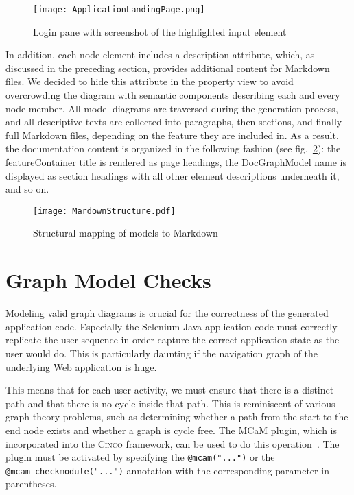 \begin{figure}[h]
    \centering
    \texttt{[image: ApplicationLandingPage.png]}
    \caption{Login pane with screenshot of the highlighted input element}
    \label{fig:screenshot}
\end{figure}

In addition, each node element includes a description attribute, which, as discussed in the preceding section, provides additional content for Markdown files. We decided to hide this attribute in the property view to avoid overcrowding the diagram with semantic components describing each and every node member. All model diagrams are traversed during the generation process, and all descriptive texts are collected into paragraphs, then sections, and finally full Markdown files, depending on the feature they are included in. As a result, the documentation content is organized in the following fashion (see fig.~\ref{fig:markdown}): the featureContainer title is rendered as page headings, the DocGraphModel name is displayed as section headings with all other element descriptions underneath it, and so on.

\begin{figure}[h]
    \centering
    \texttt{[image: MardownStructure.pdf]}
    \caption{Structural mapping of models to Markdown}
    \label{fig:markdown}
\end{figure}

\section{Graph Model Checks}\label{sec:modCheck}

Modeling valid graph diagrams is crucial for the correctness of the generated application code. Especially the Selenium-Java application code must correctly replicate the user sequence in order capture the correct application state as the user would do. This is particularly daunting if the navigation graph of the underlying Web application is huge.

This means that for each user activity, we must ensure that there is a distinct path and that there is no cycle inside that path. This is reminiscent of various graph theory problems, such as determining whether a path from the start to the end node exists and whether a graph is cycle free. The MCaM plugin, which is incorporated into the \textsc{Cinco} framework, can be used to do this operation~\cite{gitlabcinco}. The plugin must be activated by specifying the \lstinline{@mcam("...")} or the \lstinline{@mcam_checkmodule("...")} annotation with the corresponding parameter in parentheses. 

